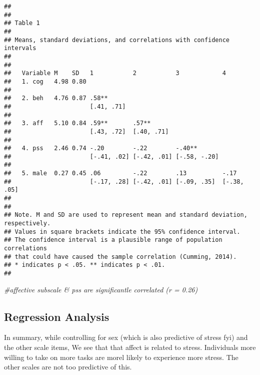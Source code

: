 \documentclass[]{article}
\newenvironment{Shaded}{\begin{snugshade}}{\end{snugshade}}
\newcommand{\CommentTok}[1]{\textcolor[rgb]{0.56,0.35,0.01}{\textit{#1}}}
\begin{document}
\begin{verbatim}
## 
## 
## Table 1 
## 
## Means, standard deviations, and correlations with confidence intervals
##  
## 
##   Variable M    SD   1           2           3            4          
##   1. cog   4.98 0.80                                                 
##                                                                      
##   2. beh   4.76 0.87 .58**                                           
##                      [.41, .71]                                      
##                                                                      
##   3. aff   5.10 0.84 .59**       .57**                               
##                      [.43, .72]  [.40, .71]                          
##                                                                      
##   4. pss   2.46 0.74 -.20        -.22        -.40**                  
##                      [-.41, .02] [-.42, .01] [-.58, -.20]            
##                                                                      
##   5. male  0.27 0.45 .06         -.22        .13          -.17       
##                      [-.17, .28] [-.42, .01] [-.09, .35]  [-.38, .05]
##                                                                      
## 
## Note. M and SD are used to represent mean and standard deviation, respectively.
## Values in square brackets indicate the 95% confidence interval.
## The confidence interval is a plausible range of population correlations 
## that could have caused the sample correlation (Cumming, 2014).
## * indicates p < .05. ** indicates p < .01.
## 
\end{verbatim}

\begin{Shaded}
\begin{Highlighting}[]
\CommentTok{#affective subscale & pss are significantle correlated (r = 0.26)}
\end{Highlighting}
\end{Shaded}

\subsection{Regression Analysis}\label{regression-analysis}

In summary, while controlling for sex (which is also predictive of
stress fyi) and the other scale items, We see that that affect is
related to stress. Individuals more willing to take on more tasks are
morel likely to experience more stress. The other scales are not too
predictive of this.
\end{document}
